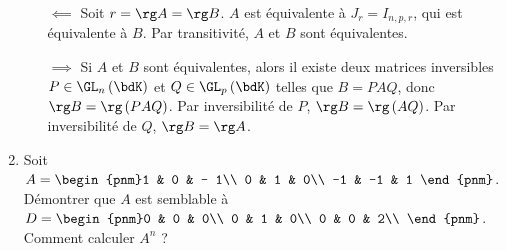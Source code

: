 \documentclass[a4paper,french,bookmarks]{article}
\begin{document}
\begin{enumerate}
\begin{nproof}
        \begin{enumerate}
                \itt $\boxed{\impliedby}$ Soit $r = \rg A = \rg B$. $A$ est équivalente à $J_r = I_{n, p, r}$, qui est équivalente à $B$. Par transitivité, $A$ et $B$ sont équivalentes.
                
                \itt $\boxed{\implies}$ Si $A$ et $B$ sont équivalentes, alors il existe deux matrices inversibles $P \in \GL_n\left(\bdK\right)$ et $Q \in \GL_p\left(\bdK\right)$ telles que $B = PAQ$, donc $\rg B = \rg\left(PAQ\right)$. Par inversibilité de $P$, $\rg B = \rg\left(AQ\right)$. Par inversibilité de $Q$, $\rg B = \rg A$.
        \end{enumerate}
    \end{nproof}
    \yesbefore
    
    
    \item Soit $A = \begin{pnm}1 & 0 & - 1\\
    0 & 1 & 0\\
    -1 & -1 & 1
    \end{pnm}$. Démontrer que $A$ est semblable à $D = \begin{pnm}0 & 0 & 0\\
    0 & 1 & 0\\
    0 & 0 & 2\\
    \end{pnm}$. Comment calculer $A^n$ ?
    

\end{enumerate}
\end{document}
